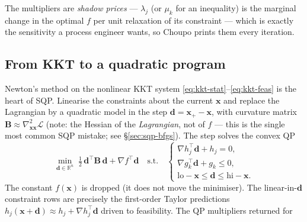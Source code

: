\documentclass[11pt,a4paper]{article}
\newcommand{\R}{\mathbb{R}}
\newcommand{\xv}{\mathbf{x}}
\newcommand{\dv}{\mathbf{d}}                          %
\newcommand{\Bv}{\mathbf{B}}                          %
\begin{document}
The multipliers are \emph{shadow prices} --- $\lambda_j$ (or $\mu_k$ for
an inequality) is the marginal change in the optimal $f$ per unit
relaxation of its constraint --- which is exactly the sensitivity a
process engineer wants, so Choupo prints them every iteration.

\subsection{From KKT to a quadratic program}

Newton's method on the nonlinear KKT system
\eqref{eq:kkt-stat}--\eqref{eq:kkt-feas} is the heart of SQP. Linearise
the constraints about the current $\xv$ and replace the Lagrangian by a
quadratic model in the step $\dv = \xv_{+} - \xv$, with curvature
matrix $\Bv \approx \nabla^2_{\!\xv\xv}\mathcal L$ (note: the Hessian of
the \emph{Lagrangian}, not of $f$ --- this is the single most common
SQP mistake; see §\ref{sec:sqp-bfgs}). The step solves the convex QP
\begin{equation}
   \min_{\dv \in \R^n} \;
     \tfrac12\, \dv^{\!\top} \Bv\, \dv + \nabla f^{\!\top} \dv
   \quad \text{s.t.} \quad
   \begin{cases}
     \nabla h_j^{\!\top} \dv + h_j = 0, \\
     \nabla g_k^{\!\top} \dv + g_k \le 0, \\
     \mathrm{lo} - \xv \le \dv \le \mathrm{hi} - \xv.
   \end{cases}
   \label{eq:sqp-qp}
\end{equation}
The constant $f(\xv)$ is dropped (it does not move the minimiser). The
linear-in-$\dv$ constraint rows are precisely the first-order Taylor
predictions $h_j(\xv + \dv) \approx h_j + \nabla h_j^{\!\top}\dv$ driven
to feasibility. The QP multipliers returned for
\end{document}
